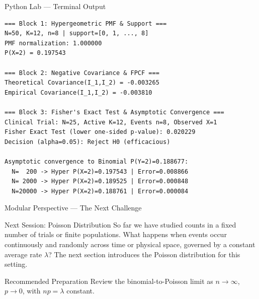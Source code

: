 \documentclass[aspectratio=169,xcolor={dvipsnames,table}]{beamer}
\begin{document}
\begin{frame}[fragile]{Python Lab --- Terminal Output}
\vspace{-0.1cm}
\begin{block}{}
\fontsize{4pt}{5pt}\selectfont
\begin{verbatim}
=== Block 1: Hypergeometric PMF & Support ===
N=50, K=12, n=8 | support=[0, 1, ..., 8]
PMF normalization: 1.000000
P(X=2) = 0.197543

=== Block 2: Negative Covariance & FPCF ===
Theoretical Covariance(I_1,I_2) = -0.003265
Empirical Covariance(I_1,I_2) = -0.003810

=== Block 3: Fisher's Exact Test & Asymptotic Convergence ===
Clinical Trial: N=25, Active K=12, Events n=8, Observed X=1
Fisher Exact Test (lower one-sided p-value): 0.020229
Decision (alpha=0.05): Reject H0 (efficacious)

Asymptotic convergence to Binomial P(Y=2)=0.188677:
  N=  200 -> Hyper P(X=2)=0.197543 | Error=0.008866
  N= 2000 -> Hyper P(X=2)=0.189525 | Error=0.000848
  N=20000 -> Hyper P(X=2)=0.188761 | Error=0.000084
\end{verbatim}
\end{block}
\end{frame}

\begin{frame}{Modular Perspective --- The Next Challenge}
\scriptsize
\begin{alertblock}{Next Session: Poisson Distribution}
So far we have studied counts in a fixed number of trials or finite populations.
What happens when events occur continuously and randomly across time or physical
space, governed by a constant average rate $\lambda$? The next section introduces
the Poisson distribution for this setting.
\end{alertblock}
\vspace{0.08cm}
\begin{block}{Recommended Preparation}
Review the binomial-to-Poisson limit as $n\to\infty$, $p\to 0$, with $np=\lambda$ constant.
\end{block}
\end{frame}
\end{document}
